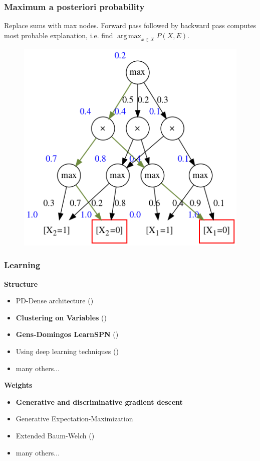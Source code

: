 \documentclass{beamer}
\DeclareMathOperator*{\argmax}{arg\,max}
\begin{document}
\begin{frame}
  \frametitle{Maximum a posteriori probability}

  Replace sums with max nodes. Forward pass followed by backward pass computes most probable
  explanation, i.e. find $\argmax_{x\in X} P(X, E)$.

  \begin{figure}
    \centering\includegraphics[height=0.6\textheight]{imgs/sample_mpn_prob.png}
  \end{figure}
\end{frame}

\begin{frame}
  \frametitle{Learning}

  \textbf{Structure}
  \begin{itemize}
    \item PD-Dense architecture (\cite{poon-domingos})
    \item \textbf{Clustering on Variables} (\cite{clustering})
    \item \textbf{Gens-Domingos LearnSPN} (\cite{gens-domingos})
    \item Using deep learning techniques (\cite{deep-learn-spn})
    \item many others...
  \end{itemize}

  \textbf{Weights}
  \begin{itemize}
    \item \textbf{Generative and discriminative gradient descent}
    \item Generative Expectation-Maximization
    \item Extended Baum-Welch (\cite{baum-welch})
    \item many others...
  \end{itemize}
\end{frame}
\end{document}
